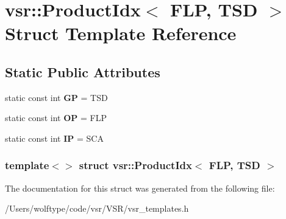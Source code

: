 \hypertarget{structvsr_1_1_product_idx_3_01_f_l_p_00_01_t_s_d_01_4}{\section{vsr\-:\-:Product\-Idx$<$ F\-L\-P, T\-S\-D $>$ Struct Template Reference}
\label{structvsr_1_1_product_idx_3_01_f_l_p_00_01_t_s_d_01_4}
}
\subsection*{Static Public Attributes}
\begin{DoxyCompactItemize}
\item 
\hypertarget{structvsr_1_1_product_idx_3_01_f_l_p_00_01_t_s_d_01_4_a9ebd2cf5d0143b6fd15380d72c3c3178}{static const int {\bfseries G\-P} = T\-S\-D}\label{structvsr_1_1_product_idx_3_01_f_l_p_00_01_t_s_d_01_4_a9ebd2cf5d0143b6fd15380d72c3c3178}

\item 
\hypertarget{structvsr_1_1_product_idx_3_01_f_l_p_00_01_t_s_d_01_4_a97937fdf4519c3cd328faa4c282796f3}{static const int {\bfseries O\-P} = F\-L\-P}\label{structvsr_1_1_product_idx_3_01_f_l_p_00_01_t_s_d_01_4_a97937fdf4519c3cd328faa4c282796f3}

\item 
\hypertarget{structvsr_1_1_product_idx_3_01_f_l_p_00_01_t_s_d_01_4_a12c3f82d4dc59b73c28b7d943305c6f8}{static const int {\bfseries I\-P} = S\-C\-A}\label{structvsr_1_1_product_idx_3_01_f_l_p_00_01_t_s_d_01_4_a12c3f82d4dc59b73c28b7d943305c6f8}

\end{DoxyCompactItemize}
\subsubsection*{template$<$$>$ struct vsr\-::\-Product\-Idx$<$ F\-L\-P, T\-S\-D $>$}



The documentation for this struct was generated from the following file\-:\begin{DoxyCompactItemize}
\item 
/\-Users/wolftype/code/vsr/\-V\-S\-R/vsr\-\_\-templates.\-h\end{DoxyCompactItemize}
